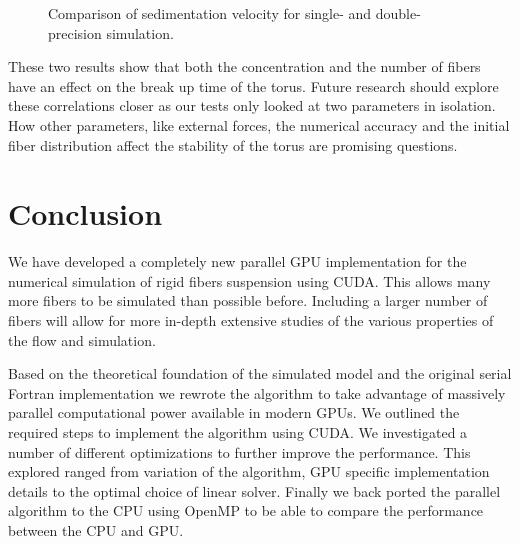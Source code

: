 \documentclass[a4paper,11pt]{kth-mag}
\begin{document}
\begin{figure}[!htbp]
  \centering
  \caption{Comparison of sedimentation velocity for single- and double-precision simulation.}
  \label{fig:number_breakup}
\end{figure}

These two results show that both the concentration and the number of fibers have an effect on the break up time of the torus. Future research should explore these correlations closer as our tests only looked at two parameters in isolation. How other parameters, like external forces, the numerical accuracy and the initial fiber distribution affect the stability of the torus are promising questions.

\chapter{Conclusion}

We have developed a completely new parallel GPU implementation for the numerical simulation of rigid fibers suspension using CUDA. This allows many more fibers to be simulated than possible before. Including a larger number of fibers will allow for more in-depth extensive studies of the various properties of the flow and simulation.

Based on the theoretical foundation of the simulated model and the original serial Fortran implementation we rewrote the algorithm to take advantage of massively parallel computational power available in modern GPUs. We outlined the required steps to implement the algorithm using CUDA. We investigated a number of different optimizations to further improve the performance. This explored ranged from variation of the algorithm, GPU specific implementation details to the optimal choice of linear solver. Finally we back ported the parallel algorithm to the CPU using OpenMP to be able to compare the performance between the CPU and GPU.
\end{document}
